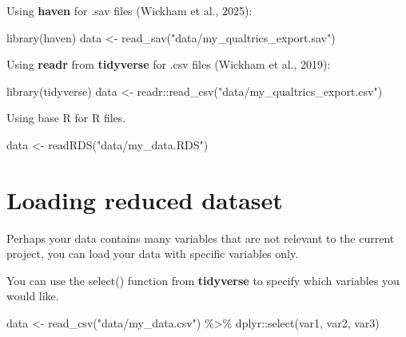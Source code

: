\documentclass[
  letterpaper,
  DIV=11,
  numbers=noendperiod]{scrreprt}
\newenvironment{Shaded}{\begin{snugshade}}{\end{snugshade}}
\newcommand{\FunctionTok}[1]{\textcolor[rgb]{0.28,0.35,0.67}{#1}}
\newcommand{\NormalTok}[1]{\textcolor[rgb]{0.00,0.23,0.31}{#1}}
\newcommand{\OtherTok}[1]{\textcolor[rgb]{0.00,0.23,0.31}{#1}}
\newcommand{\SpecialCharTok}[1]{\textcolor[rgb]{0.37,0.37,0.37}{#1}}
\newcommand{\StringTok}[1]{\textcolor[rgb]{0.13,0.47,0.30}{#1}}
\begin{document}
Using \textbf{haven} for .sav files (Wickham et al., 2025):

\begin{Shaded}
\begin{Highlighting}[]
\FunctionTok{library}\NormalTok{(haven)}
\NormalTok{data }\OtherTok{\textless{}{-}} \FunctionTok{read\_sav}\NormalTok{(}\StringTok{"data/my\_qualtrics\_export.sav"}\NormalTok{)}
\end{Highlighting}
\end{Shaded}

Using \textbf{readr} from \textbf{tidyverse} for .csv files (Wickham et
al., 2019):

\begin{Shaded}
\begin{Highlighting}[]
\FunctionTok{library}\NormalTok{(tidyverse)}
\NormalTok{data }\OtherTok{\textless{}{-}}\NormalTok{ readr}\SpecialCharTok{::}\FunctionTok{read\_csv}\NormalTok{(}\StringTok{"data/my\_qualtrics\_export.csv"}\NormalTok{)}
\end{Highlighting}
\end{Shaded}

Using base R for R files.

\begin{Shaded}
\begin{Highlighting}[]
\NormalTok{data }\OtherTok{\textless{}{-}} \FunctionTok{readRDS}\NormalTok{(}\StringTok{"data/my\_data.RDS"}\NormalTok{)}
\end{Highlighting}
\end{Shaded}

\section{Loading reduced dataset}\label{loading-reduced-dataset}

Perhaps your data contains many variables that are not relevant to the
current project, you can load your data with specific variables only.

You can use the select() function from \textbf{tidyverse} to specify
which variables you would like.

\begin{Shaded}
\begin{Highlighting}[]
\NormalTok{data }\OtherTok{\textless{}{-}} \FunctionTok{read\_csv}\NormalTok{(}\StringTok{"data/my\_data.csv"}\NormalTok{) }\SpecialCharTok{\%\textgreater{}\%}
\NormalTok{  dplyr}\SpecialCharTok{::}\FunctionTok{select}\NormalTok{(var1, var2, var3)}
\end{Highlighting}
\end{Shaded}
\end{document}
